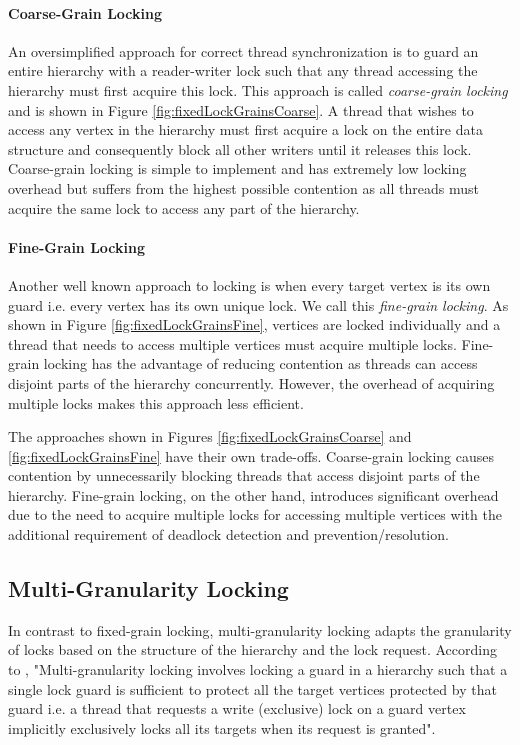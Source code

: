 \paragraph{Coarse-Grain Locking}
An oversimplified approach for correct thread synchronization is to guard an entire hierarchy with a reader-writer lock such that any thread accessing the hierarchy must first acquire this lock.
This approach is called \emph{coarse-grain locking} and is shown in Figure \ref{fig:fixedLockGrainsCoarse}.
A thread that wishes to access any vertex in the hierarchy must first acquire a lock on the entire data structure and consequently block all other writers until it releases this lock. 
Coarse-grain locking is simple to implement and has extremely low locking overhead but suffers from the highest possible contention as all threads must acquire the same lock to access any part of the hierarchy. 


\paragraph{Fine-Grain Locking}
Another well known approach to locking is when every target vertex is its own guard i.e. every vertex has its own unique lock. 
We call this \emph{fine-grain locking}.
As shown in Figure \ref{fig:fixedLockGrainsFine}, vertices are locked individually and a thread that needs to access multiple vertices must acquire multiple locks. 
Fine-grain locking has the advantage of reducing contention as threads can access disjoint parts of the hierarchy concurrently. 
However, the overhead of acquiring multiple locks makes this approach less efficient. 


The approaches shown in Figures \ref{fig:fixedLockGrainsCoarse} and \ref{fig:fixedLockGrainsFine} have their own trade-offs. 
Coarse-grain locking causes contention by unnecessarily blocking threads that access disjoint parts of the hierarchy. 
Fine-grain locking, on the other hand, introduces significant overhead due to the need to acquire multiple locks for accessing multiple vertices with the additional requirement of deadlock detection and prevention/resolution.

\subsection{Multi-Granularity Locking}
In contrast to fixed-grain locking, multi-granularity locking adapts the granularity of locks based on the structure of the hierarchy and the lock request. 
According to \citet{gray1975granularity}, "Multi-granularity locking involves locking a guard in a hierarchy such that a single lock guard is sufficient to protect all the target vertices protected by that guard i.e. a thread that requests a write (exclusive) lock on a guard vertex implicitly exclusively locks all its targets when its request is granted". 

